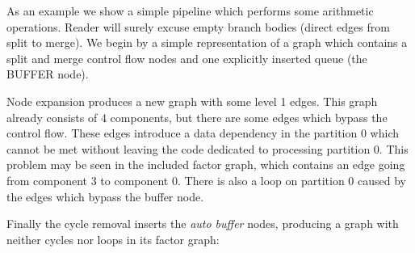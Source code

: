 As an example we show a simple pipeline which performs some arithmetic operations. Reader will surely excuse empty branch bodies (direct edges from split to merge). We begin by a simple representation of a graph which contains a split and merge control flow nodes and one explicitly inserted queue (the BUFFER node).


Node expansion produces a new graph with some level 1 edges. This graph already consists of 4 components, but there are some edges which bypass the control flow. These edges introduce a data dependency in the partition 0 which cannot be met without leaving the code dedicated to processing partition 0. This problem may be seen in the included factor graph, which contains an edge going from component 3 to component 0. There is also a loop on partition 0 caused by the edges which bypass the buffer node. 


Finally the cycle removal inserts the \emph{auto buffer} nodes, producing a graph with neither cycles nor loops in its factor graph:


